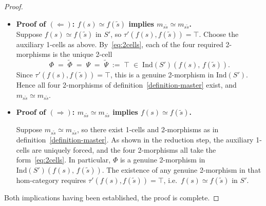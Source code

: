 \documentclass[10pt,a4paper]{amsart}
\begin{document}
\begin{proof}
\begin{itemize}
  \item \textbf{Proof of $(\Leftarrow)$: $f(s) \simeq f(\tilde{s})$
    implies $m_{s\tilde{s}} \simeq m_{s\tilde{s}}$.} \\
  Suppose $f(s) \simeq f(\tilde{s})$ in $S'$, so $\tau'(f(s),f(\tilde{s}))
    = \top$. Choose the auxiliary 1-cells as above. By~\eqref{eq:2cells}, each
  of the four required 2-morphisms is the unique 2-cell
  \[
    \Phi \;=\; \widetilde{\Phi} \;=\; \Psi \;=\; \widetilde{\Psi}
    \;:=\; \top
    \;\in\; \mathrm{Ind}(S')(f(s),\,f(\tilde{s})).
  \]
  Since $\tau'(f(s), f(\tilde{s})) = \top$, this is a genuine 2-morphism
  in $\mathrm{Ind}(S')$. Hence all four 2-morphisms of definition~\ref{definition-master}
  exist, and $m_{s\tilde{s}} \simeq m_{s\tilde{s}}$.

 \item \textbf{Proof of $(\Rightarrow)$: $m_{s\tilde{s}} \simeq m_{s\tilde{s}}$ implies
    $f(s) \simeq f(\tilde{s})$.}

  \medskip
  Suppose $m_{s\tilde{s}} \simeq m_{s\tilde{s}}$, so there exist 1-cells and 2-morphisms as in
  definition~\ref{definition-master}. As shown in the reduction step, the auxiliary
  1-cells are uniquely forced, and the four 2-morphisms all take the
  form~\eqref{eq:2cells}. In particular, $\Phi$ is a genuine 2-morphism in
  $\mathrm{Ind}(S')(f(s),\,f(\tilde{s}))$. The existence of any genuine 2-morphism in
  that hom-category requires $\tau'(f(s), f(\tilde{s})) = \top$, i.e.\
  $f(s) \simeq f(\tilde{s})$ in $S'$.
  \end{itemize}
  Both implications having been established, the proof is complete.
\end{proof}
\end{document}
